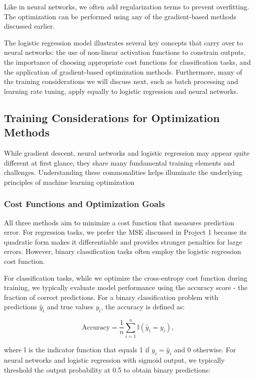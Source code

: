 Like in neural networks, we often add regularization terms to prevent overfitting. The optimization can be performed using any of the gradient-based methods discussed earlier.

The logistic regression model illustrates several key concepts that carry over to neural networks: the use of non-linear activation functions to constrain outputs, the importance of choosing appropriate cost functions for classification tasks, and the application of gradient-based optimization methods. Furthermore, many of the training considerations we will discuss next, such as batch processing and learning rate tuning, apply equally to logistic regression and neural networks.
\subsection{Training Considerations for Optimization Methods}
While gradient descent, neural networks and logistic regression may appear quite different at first glance, they share many fundamental training elements and challenges. Understanding these commonalities helps illuminate the underlying principles of machine learning optimization

\subsubsection{Cost Functions and Optimization Goals}
All three methods aim to minimize a cost function that measures prediction error. For regression tasks, we prefer the MSE discussed in Project 1 because its quadratic form makes it differentiable and provides stronger penalties for large errors. However, binary classification tasks often employ the logistic regression cost function.

For classification tasks, while we optimize the cross-entropy cost function during training, we typically evaluate model performance using the accuracy score - the fraction of correct predictions. For a binary classification problem with predictions \( \hat{y}_i \) and true values \( y_i \), the accuracy is defined as:

\begin{equation}
    \text{Accuracy} = \frac{1}{n}\sum_{i=1}^{n} \mathbb{I}(\hat{y}_i = y_i),
\end{equation}

where \( \mathbb{I}\) is the indicator function that equals 1 if \( y_i = \hat{y}_i \) and 0 otherwise. For neural networks and logistic regression with sigmoid output, we typically threshold the output probability at 0.5 to obtain binary predictions:

